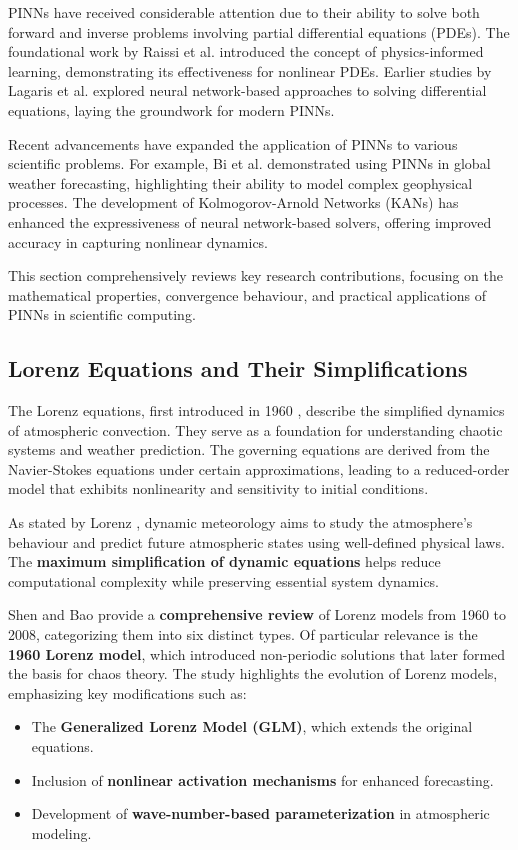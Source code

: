 \documentclass{article}
\begin{document}
PINNs have received considerable attention due to their ability to solve both forward and inverse problems involving partial differential equations (PDEs). The foundational work by Raissi et al. \cite{Physics_Informed_Deep_Learning_Part1_Raissi_Peridkaris_Karniadakis} introduced the concept of physics-informed learning, demonstrating its effectiveness for nonlinear PDEs. Earlier studies by Lagaris et al. \cite{lagaris1998artificial} explored neural network-based approaches to solving differential equations, laying the groundwork for modern PINNs.

Recent advancements have expanded the application of PINNs to various scientific problems. For example, Bi et al. \cite{bi2023weather} demonstrated using PINNs in global weather forecasting, highlighting their ability to model complex geophysical processes. The development of Kolmogorov-Arnold Networks (KANs) \cite{liu2024kan} has enhanced the expressiveness of neural network-based solvers, offering improved accuracy in capturing nonlinear dynamics.

This section comprehensively reviews key research contributions, focusing on the mathematical properties, convergence behaviour, and practical applications of PINNs in scientific computing.

\subsection{Lorenz Equations and Their Simplifications}
The Lorenz equations, first introduced in 1960 \cite{lorenz1960}, describe the simplified dynamics of atmospheric convection. They serve as a foundation for understanding chaotic systems and weather prediction. The governing equations are derived from the Navier-Stokes equations under certain approximations, leading to a reduced-order model that exhibits nonlinearity and sensitivity to initial conditions.

As stated by Lorenz \cite{lorenz1960}, dynamic meteorology aims to study the atmosphere's behaviour and predict future atmospheric states using well-defined physical laws. The \textbf{maximum simplification of dynamic equations} helps reduce computational complexity while preserving essential system dynamics.

Shen and Bao \cite{shen2008} provide a \textbf{comprehensive review} of Lorenz models from 1960 to 2008, categorizing them into six distinct types. Of particular relevance is the \textbf{1960 Lorenz model}, which introduced non-periodic solutions that later formed the basis for chaos theory. The study highlights the evolution of Lorenz models, emphasizing key modifications such as:
\begin{itemize}
    \item The \textbf{Generalized Lorenz Model (GLM)}, which extends the original equations.
    \item Inclusion of \textbf{nonlinear activation mechanisms} for enhanced forecasting.
    \item Development of \textbf{wave-number-based parameterization} in atmospheric modeling.
\end{itemize}
\end{document}
